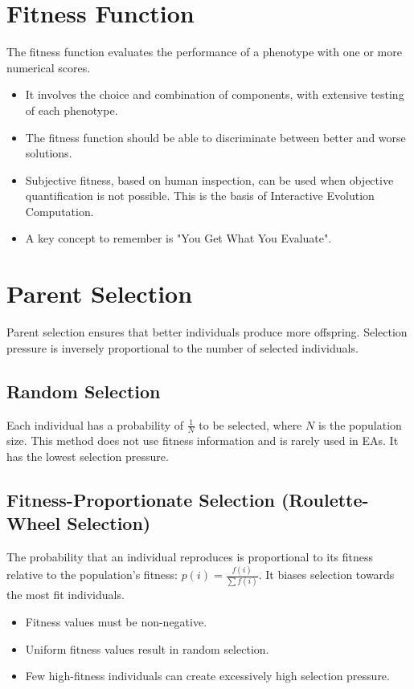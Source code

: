 \section{Fitness Function}
The fitness function evaluates the performance of a phenotype with one or more numerical scores.
\begin{itemize}
    \item It involves the choice and combination of components, with extensive testing of each phenotype.
    \item   The fitness function should be able to discriminate between better and worse solutions.
     \item  Subjective fitness, based on human inspection, can be used when objective quantification is not possible. This is the basis of Interactive Evolution Computation.
    \item  A key concept to remember is "You Get What You Evaluate".
\end{itemize}

\section{Parent Selection}
Parent selection ensures that better individuals produce more offspring. Selection pressure is inversely proportional to the number of selected individuals.

\subsection*{Random Selection}
Each individual has a probability of \(\frac{1}{N}\) to be selected, where \(N\) is the population size. This method does not use fitness information and is rarely used in EAs. It has the lowest selection pressure.

\subsection*{Fitness-Proportionate Selection (Roulette-Wheel Selection)}
The probability that an individual reproduces is proportional to its fitness relative to the population's fitness: \(p(i) = \frac{f(i)}{\sum{f(i)}}\). It biases selection towards the most fit individuals.
    \begin{itemize}
        \item   Fitness values must be non-negative.
        \item   Uniform fitness values result in random selection.
        \item   Few high-fitness individuals can create excessively high selection pressure.
    \end{itemize}


